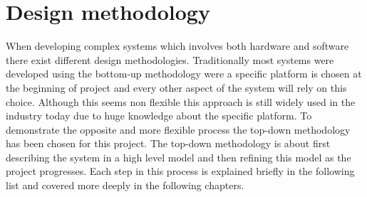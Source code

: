 \chapter{Design methodology}

When developing complex systems which involves both hardware and software there exist different design methodologies. Traditionally most systems were developed using the bottom-up methodology were a specific platform is chosen at the beginning of project and every other aspect of the system will rely on this choice. Although this seems non flexible this approach is still widely used in the industry today due to huge knowledge about the specific platform.
To demonstrate the opposite and more flexible process the top-down methodology has been chosen for this project. The top-down methodology is about first describing the system in a high level model and then refining this model as the project progresses.
Each step in this process is explained briefly in the following list and covered more deeply in the following chapters.


